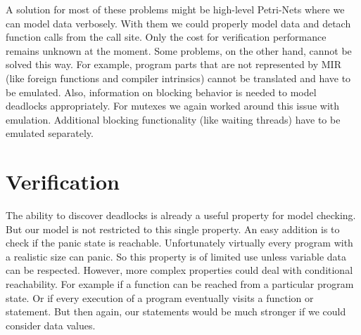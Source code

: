 A solution for most of these problems might be high-level Petri-Nets where we can model data verbosely.
With them we could properly model data and detach function calls from the call site.
Only the cost for verification performance remains unknown at the moment.
Some problems, on the other hand, cannot be solved this way.
For example, program parts that are not represented by MIR (like foreign functions and compiler intrinsics) cannot be translated and have to be emulated.
Also, information on blocking behavior is needed to model deadlocks appropriately.
For mutexes we again worked around this issue with emulation.
Additional blocking functionality (like waiting threads) have to be emulated separately.

\section{Verification}
The ability to discover deadlocks is already a useful property for model checking.
But our model is not restricted to this single property.
An easy addition is to check if the panic state is reachable.
Unfortunately virtually every program with a realistic size can panic.
So this property is of limited use unless variable data can be respected.
However, more complex properties could deal with conditional reachability.
For example if a function can be reached from a particular program state.
Or if every execution of a program eventually visits a function or statement.
But then again, our statements would be much stronger if we could consider data values.

